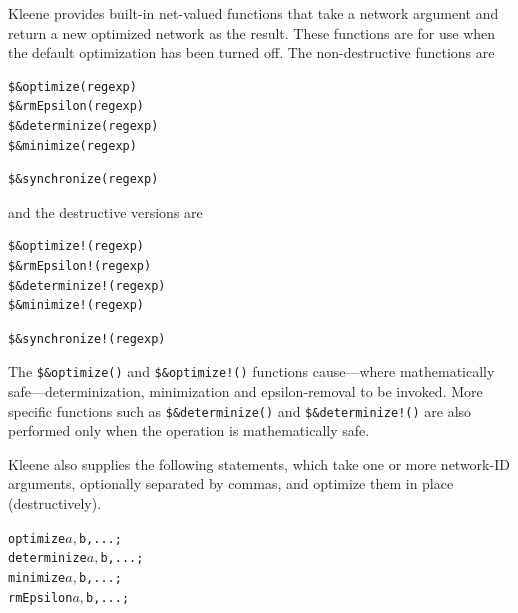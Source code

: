 \documentclass[letterpaper,12pt]{article}
\begin{document}
Kleene provides built-in net-valued functions that take a network
argument and return a new optimized network as the result.  These
functions are for use when the default optimization has been turned off.
The non-destructive functions are

\begin{Verbatim}[fontsize=\small]
$&optimize(regexp)
$&rmEpsilon(regexp)
$&determinize(regexp)
$&minimize(regexp)
\end{Verbatim}

\begin{samepage}
\begin{changebar}

\begin{Verbatim}[fontsize=\small]
$&synchronize(regexp)
\end{Verbatim}

\end{changebar}
\end{samepage}

\noindent
and the destructive versions are

\begin{Verbatim}[fontsize=\small]
$&optimize!(regexp)
$&rmEpsilon!(regexp)
$&determinize!(regexp)
$&minimize!(regexp)
\end{Verbatim}

\begin{samepage}
\begin{changebar}

\begin{Verbatim}[fontsize=\small]
$&synchronize!(regexp)
\end{Verbatim}

\end{changebar}
\end{samepage}

\noindent
The \verb!$&optimize()! and \verb/$&optimize!()/ functions cause---where
mathematically safe---determinization, minimization and epsilon-removal to
be invoked.  More specific functions such as \verb!$&determinize()! and
\verb/$&determinize!()/ are also performed only when the operation is
mathematically safe.

Kleene also supplies the following statements, which take one or more
network-ID arguments, optionally separated by commas, and optimize them
in place (destructively).

\begin{alltt}
optimize $a, $b, ... ;
determinize $a, $b, ... ;
minimize $a, $b, ... ;
rmEpsilon $a, $b, ... ;
\end{alltt}
\end{document}
